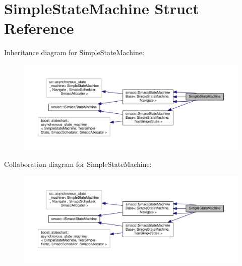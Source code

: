 \hypertarget{structSimpleStateMachine}{\section{Simple\-State\-Machine Struct Reference}
\label{structSimpleStateMachine}
}


Inheritance diagram for Simple\-State\-Machine\-:
\nopagebreak
\begin{figure}[H]
\begin{center}
\leavevmode
\includegraphics[width=350pt]{structSimpleStateMachine__inherit__graph}
\end{center}
\end{figure}


Collaboration diagram for Simple\-State\-Machine\-:
\nopagebreak
\begin{figure}[H]
\begin{center}
\leavevmode
\includegraphics[width=350pt]{structSimpleStateMachine__coll__graph}
\end{center}
\end{figure}
